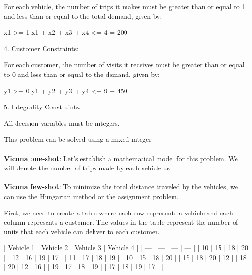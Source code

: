 \documentclass{article}%
\begin{document}
For each vehicle, the number of trips it makes must be greater than or equal to 1 and less than or equal to the total demand, given by:

x1 >= 1
x1 + x2 + x3 + x4 <= 4  = 200

4. Customer Constraints:

For each customer, the number of visits it receives must be greater than or equal to 0 and less than or equal to the demand, given by:

y1 >= 0
y1 + y2 + y3 + y4 <= 9  = 450

5. Integrality Constraints:

All decision variables must be integers.

This problem can be solved using a mixed-integer\\\\%
\textbf{Vicuna one-shot}: Let's establish a mathematical model for this problem. We will denote the number of trips made by each vehicle as\\\\%
\textbf{Vicuna few-shot}: To minimize the total distance traveled by the vehicles, we can use the Hungarian method or the assignment problem.

First, we need to create a table where each row represents a vehicle and each column represents a customer. The values in the table represent the number of units that each vehicle can deliver to each customer.

| Vehicle 1 | Vehicle 2 | Vehicle 3 | Vehicle 4 |
| --- | --- | --- | --- |
| 10 | 15 | 18 | 20 |
| 12 | 16 | 19 | 17 |
| 11 | 17 | 18 | 19 |
| 10 | 15 | 18 | 20 |
| 15 | 18 | 20 | 12 |
| 18 | 20 | 12 | 16 |
| 19 | 17 | 18 | 19 |
| 17 | 18 | 19 | 17 |
|\\\\%
\end{document}
